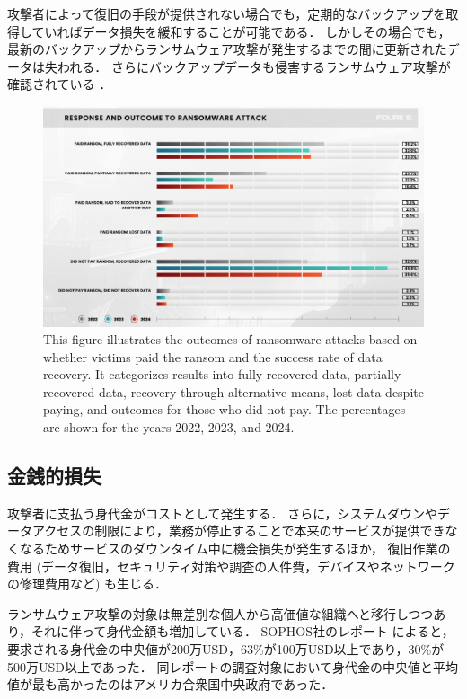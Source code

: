 攻撃者によって復旧の手段が提供されない場合でも，定期的なバックアップを取得していればデータ損失を緩和することが可能である．
しかしその場合でも，最新のバックアップからランサムウェア攻撃が発生するまでの間に更新されたデータは失われる\cite{wang2024ransom}．
さらにバックアップデータも侵害するランサムウェア攻撃が確認されている \cite{spycloud-ransomware}．
\begin{figure}[t]
  \begin{center}
    \includegraphics[width=\columnwidth]{doc/img/pay-ransom-back-data.eps}
  \end{center}
  \caption{
    This figure illustrates the outcomes of ransomware attacks based on whether victims paid the ransom and the success rate of data recovery.
    It categorizes results into fully recovered data, partially recovered data, recovery through alternative means, lost data despite paying, and outcomes for those who did not pay.
    The percentages are shown for the years 2022, 2023, and 2024. \cite{spycloud-ransomware}}
  \label{fig:pay-ransom-back-data}
\end{figure}


\subsection{金銭的損失}
攻撃者に支払う身代金がコストとして発生する．
さらに，システムダウンやデータアクセスの制限により，業務が停止することで本来のサービスが提供できなくなるためサービスのダウンタイム中に機会損失が発生するほか，
復旧作業の費用 (データ復旧，セキュリティ対策や調査の人件費，デバイスやネットワークの修理費用など) も生じる．

ランサムウェア攻撃の対象は無差別な個人から高価値な組織へと移行しつつあり，それに伴って身代金額も増加している．
SOPHOS社のレポート \cite{sophos-report:online} によると，
要求される身代金の中央値が200万USD，63\%が100万USD以上であり，30\%が500万USD以上であった．
同レポートの調査対象において身代金の中央値と平均値が最も高かったのはアメリカ合衆国中央政府であった．


